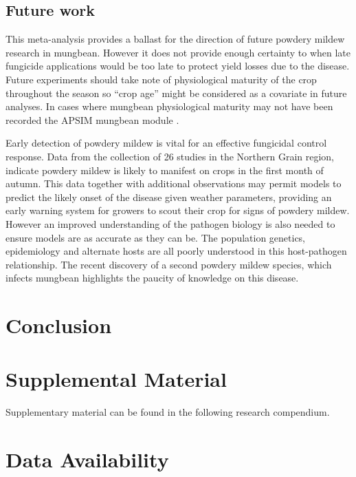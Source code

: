 \documentclass[agronomy,article,submit,moreauthors,pdftex]{mdpi}
\begin{document}
\hypertarget{future-work}{%
\subsection{Future work}\label{future-work}}

This meta-analysis provides a ballast for the direction of future powdery mildew research in mungbean.
However it does not provide enough certainty to when late fungicide applications would be too late to protect yield losses due to the disease.
Future experiments should take note of physiological maturity of the crop throughout the season so ``crop age'' might be considered as a covariate in future analyses.
In cases where mungbean physiological maturity may not have been recorded the APSIM mungbean module \citep{RobertsonAPSIMlegume2002}.

Early detection of powdery mildew is vital for an effective fungicidal control response.
Data from the collection of 26 studies in the Northern Grain region, indicate powdery mildew is likely to manifest on crops in the first month of autumn.
This data together with additional observations may permit models to predict the likely onset of the disease given weather parameters, providing an early warning system for growers to scout their crop for signs of powdery mildew.
However an improved understanding of the pathogen biology is also needed to ensure models are as accurate as they can be.
The population genetics, epidemiology and alternate hosts are all poorly understood in this host-pathogen relationship.
The recent discovery of a second powdery mildew species, which infects mungbean highlights the paucity of knowledge on this disease.

\hypertarget{conclusion}{%
\section{Conclusion}\label{conclusion}}

\hypertarget{supplemental-material}{%
\section{Supplemental Material}\label{supplemental-material}}

Supplementary material can be found in the following research compendium.

\hypertarget{data-availability}{%
\section{Data Availability}\label{data-availability}}
\end{document}
